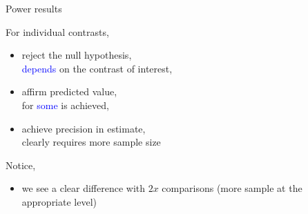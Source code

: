 %
%
\begin{lhframe}[rhgraphic={\texttt{[image: power\_result3.pdf]}}]
	{Power results} 
	
	For individual contrasts,
	\begin{itemize}
		\item reject the null hypothesis, \\
		\textcolor{blue}{depends} on the contrast of interest,
		\item affirm predicted value, \\
		for \textcolor{blue}{some} is achieved,
		\item achieve precision in estimate, \\
		clearly requires more sample size
	\end{itemize}
	
	Notice,
	\begin{itemize}
		\item we see a clear difference with $2x$ comparisons {\small (more sample at the appropriate level) }
	\end{itemize}
\end{lhframe}
%
%
